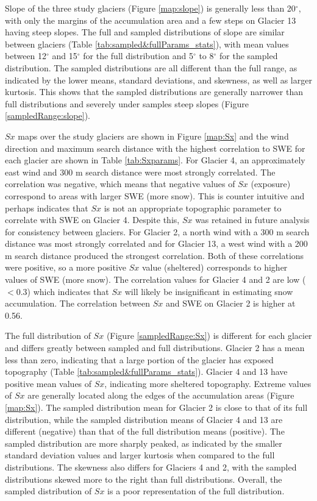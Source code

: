 \documentclass[12pt]{article}
\begin{document}
Slope of the three study glaciers (Figure \ref{map:slope}) is generally less than 20$^{\circ}$, with only the margins of the accumulation area and a few steps on Glacier 13 having steep slopes. The full and sampled distributions of slope are similar between glaciers (Table \ref{tab:sampled&fullParams_stats}), with mean values between 12$^{\circ}$ and 15$^{\circ}$ for the full distribution and 5$^{\circ}$ to 8$^{\circ}$ for the sampled distribution. The sampled distributions are all different than the full range, as indicated by the lower means, standard deviations, and skewness, as well as larger kurtosis. This shows that the sampled distributions are generally narrower than full distributions and severely under samples steep slopes (Figure \ref{sampledRange:slope}).


$Sx$ maps over the study glaciers are shown in Figure \ref{map:Sx} and the wind direction and maximum search distance with the highest correlation to SWE for each glacier are shown in Table \ref{tab:Sxparams}. For Glacier 4, an approximately east wind and 300 m search distance were most strongly correlated. The correlation was negative, which means that negative values of $Sx$ (exposure) correspond to areas with larger SWE (more snow). This is counter intuitive and perhaps indicates that $Sx$ is not an appropriate topographic parameter to correlate with SWE on Glacier 4. Despite this, $Sx$ was retained in future analysis for consistency between glaciers. For Glacier 2, a north wind with a 300 m search distance was most strongly correlated and for Glacier 13, a west wind with a 200 m search distance produced the strongest correlation. Both of these correlations were positive, so a more positive $Sx$ value (sheltered) corresponds to higher values of SWE (more snow). The correlation values for Glacier 4 and 2 are low ($<$0.3) which indicates that $Sx$ will likely be insignificant in estimating snow accumulation. The correlation between $Sx$ and SWE on Glacier 2 is higher at 0.56. 

The full distribution of $Sx$ (Figure \ref{sampledRange:Sx}) is different for each glacier and differs greatly between sampled and full distributions. Glacier 2 has a mean less than zero, indicating that a large portion of the glacier has exposed topography (Table \ref{tab:sampled&fullParams_stats}). Glacier 4 and 13 have positive mean values of $Sx$, indicating more sheltered topography. Extreme values of $Sx$ are generally located along the edges of the accumulation areas (Figure \ref{map:Sx}). The sampled distribution mean for Glacier 2 is close to that of its full distribution, while the sampled distribution means of Glacier 4 and 13 are different (negative) than that of the full distribution means (positive). The sampled distribution are more sharply peaked, as indicated by the smaller standard deviation values and larger kurtosis when compared to the full distributions. The skewness also differs for Glaciers 4 and 2, with the sampled distributions skewed more to the right than full distributions. Overall, the sampled distribution of $Sx$ is a poor representation of the full distribution. 
\end{document}
